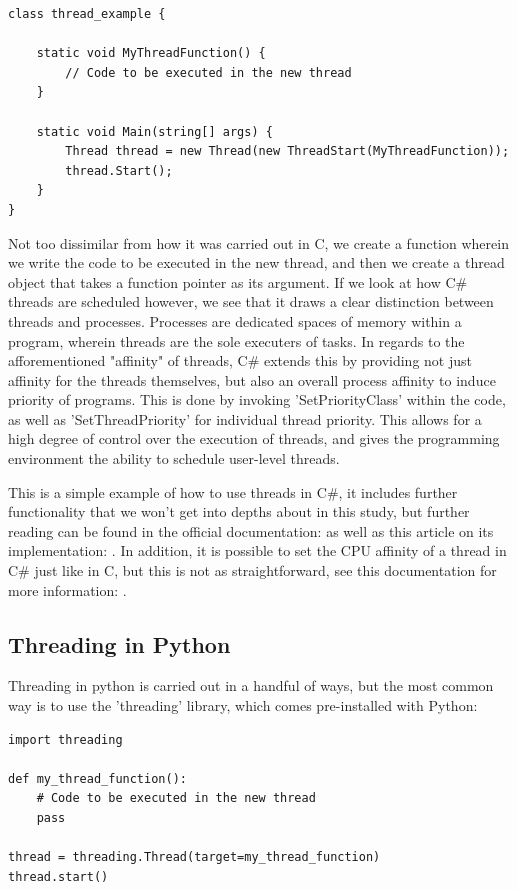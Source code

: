 \documentclass[12pt,a4paper]{article}
\begin{document}
\begin{verbatim}
class thread_example {

    static void MyThreadFunction() {
        // Code to be executed in the new thread
    }

    static void Main(string[] args) {
        Thread thread = new Thread(new ThreadStart(MyThreadFunction));
        thread.Start();
    }
}
\end{verbatim}

Not too dissimilar from how it was carried out in C, we create a function wherein we write the code to be executed in the new thread, and then we create a thread object that takes a function pointer as its argument. If we look at how C\# threads are scheduled however, we see that it draws a clear distinction between threads and processes\parencite{White2020}. Processes are dedicated spaces of memory within a program, wherein threads are the sole executers of tasks. In regards to the afforementioned "affinity" of threads, C\# extends this by providing not just affinity for the threads themselves, but also an overall process affinity to induce priority of programs. This is done by invoking 'SetPriorityClass' within the code, as well as 'SetThreadPriority' for individual thread priority\parencite{CSThreadPriority}. This allows for a high degree of control over the execution of threads, and gives the programming environment the ability to schedule user-level threads.

This is a simple example of how to use threads in C\#, it includes further functionality that we won't get into depths about in this study, but further reading can be found in the official documentation:  as well as this article on its implementation: . In addition, it is possible to set the CPU affinity of a thread in C\# just like in C, but this is not as straightforward, see this documentation for more information: \parencite{CSProcessorAffinity}.

\subsection{Threading in Python}

Threading in python is carried out in a handful of ways, but the most common way is to use the 'threading' library\parencite{PythonThreading}, which comes pre-installed with Python:

\begin{verbatim}
import threading

def my_thread_function():
    # Code to be executed in the new thread
    pass

thread = threading.Thread(target=my_thread_function)
thread.start()
\end{verbatim}
\end{document}

